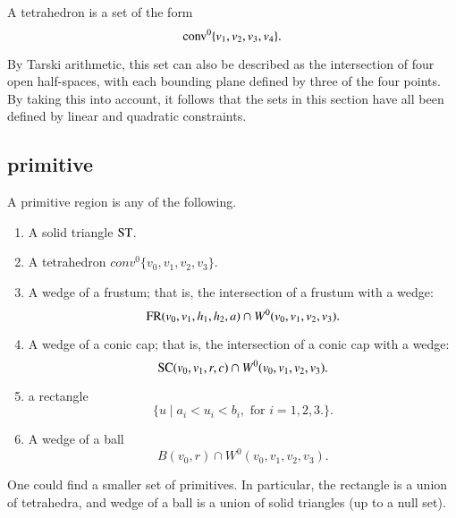 \begin{definition}[tetrahedron] A tetrahedron is a set of the form
$${\operatorname{conv}}^0\{v_1,v_2,v_3,v_4\}.$$
%
\end{definition}

By Tarski arithmetic, %
this set can also be described
as the intersection of four open half-spaces, with each bounding
plane defined by three of the four points.
By taking this into account, it follows that
the sets in this section have all been defined by linear and quadratic
constraints.
%

\subsection{primitive}
%

\begin{definition}[primitive]\label{def:primitive} 
A primitive region is any of the following.

\begin{enumerate}%
 \item A solid triangle ${\operatorname{ST}}$.
%
 \item A tetrahedron $conv^0\{v_0,v_1,v_2,v_3\}$.
 \item A wedge of a frustum;
that is, the intersection of a frustum with
 a wedge:
    $$
     {\operatorname{FR}}(v_0,v_1,h_1,h_2,a) \cap W^0(v_0,v_1,v_2,v_3).
    $$
\item A wedge of a conic cap; that is, the intersection of a conic cap
with
    a wedge:
    $$
    {\operatorname{SC}}(v_0,v_1,r,c) \cap W^0(v_0,v_1,v_2,v_3).
    $$
\item a rectangle
    $$
    \{u \mid a_i < u_i < b_i,\text { for } i=1,2,3.\}.
    $$
\item A wedge of a ball
  $$
  B(v_0,r) \cap W^0(v_0,v_1,v_2,v_3).
  $$
%
%
%
%
%
%
%
\end{enumerate}
One could find a smaller set of primitives.  In particular, the
rectangle is a union of tetrahedra, and wedge of a ball is a union of solid triangles (up to a null set).  

\end{definition}

